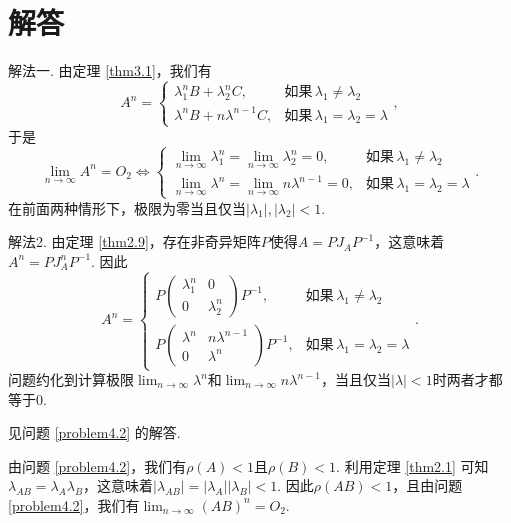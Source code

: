 \section{解答}
\setcounter{solution}{1}
\begin{solution}
  {\kaishu 解法一.} 由定理 \ref{thm3.1}，我们有
  \[
    A^n = \begin{cases}
      \lambda_1^n B + \lambda_2^n C, & \text{如果}\, \lambda_1\ne\lambda_2 \\
      \lambda^nB + n\lambda^{n-1}C, & \text{如果}\,\lambda_1=\lambda_2=\lambda
    \end{cases},
  \]
  于是
  \[
    \lim_{n\to\infty}A^n = O_2 \Leftrightarrow \begin{cases}
      \lim_ {n\to\infty}\lambda_1^n = \lim_{n\to\infty}\lambda_2^n = 0, & \text{如果}\, \lambda_1\ne\lambda_2 \\
      \lim_ {n\to\infty}\lambda^n = \lim_ {n\to\infty}n\lambda^{n-1} = 0, & \text{如果}\, \lambda_1=\lambda_2=\lambda
    \end{cases}.
  \]
  在前面两种情形下，极限为零当且仅当$|\lambda_1|,|\lambda_2|<1$.

  {\kaishu 解法2.} 由定理 \ref{thm2.9}，存在非奇异矩阵$P$使得$A=PJ_AP^{-1}$，这意味着$A^n=PJ_A^nP^{-1}$. 因此
  \[
    A^n = \begin{cases}
      P\begin{pmatrix}
        \lambda_1^n & 0 \\
        0 & \lambda_2^n
      \end{pmatrix}P^{-1}, & \text{如果}\, \lambda_1\ne \lambda_2 \\
      P\begin{pmatrix}
        \lambda^n & n\lambda^{n-1} \\
        0 & \lambda^n
      \end{pmatrix}P^{-1}, & \text{如果}\,\lambda_1=\lambda_2=\lambda
    \end{cases}.
  \]
  问题约化到计算极限$\lim_{n\to\infty}\lambda^n$和$\lim_{n\to\infty}n\lambda^{n-1}$，当且仅当$|\lambda|<1$时两者才都等于0.
\end{solution}

\begin{solution}
  见问题 \ref{problem4.2} 的解答.
\end{solution}

\begin{solution}
  由问题 \ref{problem4.2}，我们有$\rho(A)<1$且$\rho(B)<1$. 利用定理 \ref{thm2.1} 可知$\lambda_{AB}=\lambda_A\lambda_B$，这意味着$|\lambda_{AB}|=|\lambda_A||\lambda_B|<1$. 因此$\rho(AB)<1$，且由问题 \ref{problem4.2}，我们有$\lim_{n\to\infty}(AB)^n=O_2$.
\end{solution}

